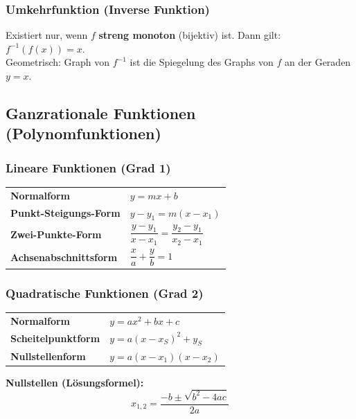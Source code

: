 \documentclass[../zusammenfassung_AN.tex]{subfiles}
\begin{document}
	\subsubsection{Umkehrfunktion (Inverse Funktion)}
	
	\begin{tcolorbox}[hinweis]
		Existiert nur, wenn $f$ \textbf{streng monoton} (bijektiv) ist.
		Dann gilt: $f^{-1}(f(x)) = x$.\\
		Geometrisch: Graph von $f^{-1}$ ist die Spiegelung des Graphs von $f$ an der Geraden $y=x$.
	\end{tcolorbox}
	
	\subsection{Ganzrationale Funktionen (Polynomfunktionen)}
	
	\subsubsection{Lineare Funktionen (Grad 1)}
	
	\begin{tcolorbox}[formelbox]
		\renewcommand{\arraystretch}{1.5}
		\begin{tabular}{ll}
			\textbf{Normalform}         & $y = mx + b$ \\
			\textbf{Punkt-Steigungs-Form} & $y - y_1 = m(x-x_1)$ \\
			\textbf{Zwei-Punkte-Form}   & $\dfrac{y-y_1}{x-x_1} = \dfrac{y_2-y_1}{x_2-x_1}$ \\[6pt]
			\textbf{Achsenabschnittsform} & $\dfrac{x}{a}+\dfrac{y}{b}=1$ \\
		\end{tabular}
	\end{tcolorbox}
	
	\subsubsection{Quadratische Funktionen (Grad 2)}
	
	\begin{tcolorbox}[formelbox]
		\renewcommand{\arraystretch}{1.5}
		\begin{tabular}{ll}
			\textbf{Normalform}           & $y = ax^2 + bx + c$ \\
			\textbf{Scheitelpunktform}    & $y = a(x-x_S)^2 + y_S$ \\
			\textbf{Nullstellenform}      & $y = a(x-x_1)(x-x_2)$ \\
		\end{tabular}
		
		\medskip
		\textbf{Nullstellen (Lösungsformel):}
		\[
		x_{1,2} = \frac{-b \pm \sqrt{b^2-4ac}}{2a}
		\]
	\end{tcolorbox}
	
\end{document}
